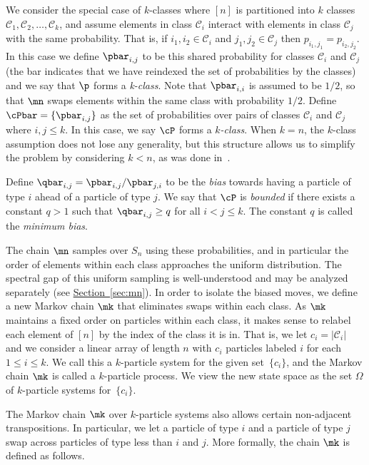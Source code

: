 \documentclass[11pt]{article}
\providecommand{\expref}[2]{\texorpdfstring{\hyperref[#2]{#1~\ref{#2}}}{#1~\ref{#2}}}
\begin{document}
We consider the special case of $k$-classes where $[n]$ is partitioned 
into $k$ classes $\mathcal{C}_1,\mathcal{C}_2,\ldots, \mathcal{C}_k$, 
and assume elements in class $\mathcal{C}_i$ interact with elements in 
class $\mathcal{C}_j$ with the same probability.  That is, if 
$i_1,i_2\in \mathcal{C}_i$ and $j_1,j_2\in \mathcal{C}_j$ then 
$p_{i_1,j_1} = p_{i_2,j_2}$.  In this case we define $\pbar_{i,j}$ to 
be this shared probability for classes $\mathcal{C}_i$ and 
$\mathcal{C}_j$ (the bar indicates that we have reindexed the set of 
probabilities by the classes) and we say that $\p$ forms a 
\emph{k-class}.  Note that $\pbar_{i,i}$ is assumed to be $1/2$, so 
that $\mn$ swaps elements within the same class with probability $1/2$.  
Define $\cPbar=\{\pbar_{i,j}\}$ as the set of probabilities over pairs 
of classes $\mathcal{C}_i$ and $\mathcal{C}_j$ where $i,j\leq k$.  In 
this case, we say $\cP$ forms a \emph{$k$-class}.  When $k=n$, the 
$k$-class assumption does not lose any generality, but this structure 
allows us to simplify the problem by considering $k<n$, as was done 
in~\cite{MS,HW16}. 

Define $\qbar_{i,j} =  \pbar_{i,j}/\pbar_{j,i}$ to be the \emph{bias} 
towards having a particle of type $i$ ahead of a particle of type $j$.  
We say that $\cP$ is \emph{bounded} if there exists a constant $q>1$ 
such that $\qbar_{i,j}\geq q$ for all $i<j\leq k$.  The constant $q$ is 
called the \emph{minimum bias}. 

The chain $\mn$ samples over $S_n$ using these probabilities, and in 
particular the order of elements within each class approaches the 
uniform distribution.  The spectral gap of this uniform sampling is 
well-understood and may be analyzed separately (see 
\expref{Section}{sec:mn}).  In order to isolate the biased moves, we define 
a new Markov chain $\mk$ that eliminates swaps within each class.  As 
$\mk$ maintains a fixed order on particles within each class, it makes 
sense to relabel each element of $[n]$ by the index of the class it is 
in.  That is, we let $c_i = |\mathcal{C}_i|$ and we consider a linear 
array of length $n$ with $c_i$ particles labeled $i$ for each $1\leq 
i\leq k$.  We call this a $k$-particle system for the given 
set~$\{c_i\}$, and the Markov chain $\mk$ is called a $k$-particle 
process.  We view the new state space as the set $\Omega$ of 
$k$-particle systems for~$\{c_i\}$.


The Markov chain $\mk$ over $k$-particle systems also allows certain 
non-adjacent transpositions.  In particular, we let a particle of type 
$i$ and a particle of type $j$ swap across particles of type less than 
$i$ and $j$.  More formally, the chain $\mk$ is defined as follows.
\end{document}
